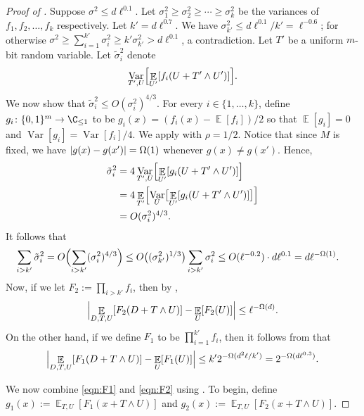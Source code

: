 \documentclass{toc}
\newcommand{\zo}{\{0,1\}}
\def\Blocklength{\ell}
\DeclarePairedDelimiter{\abs}{\lvert}{\rvert}
\DeclareMathOperator*{\E}{\mathbb{E}}                 %
\DeclareMathOperator*{\Var}{Var}                 %
\begin{document}
\begin{proof}[Proof of {}]
    Suppose $\sigma^2 \le d\Blocklength^{0.1}$.
    Let $\sigma_1^2 \ge \sigma_2^2 \ge \cdots \ge \sigma_k^2$ be the variances of $f_1, f_2, \ldots, f_k$ respectively.
    Let $k' = d\Blocklength^{0.7}$.
    We have $\sigma_{k'}^2 \le d\Blocklength^{0.1} / k' = \Blocklength^{-0.6}$; for otherwise $\sigma^2 \ge \sum_{i=1}^{k'} \sigma_i^2 \ge k' \sigma_{k'}^2 > d\Blocklength^{0.1}$, a contradiction.
    Let $T'$ be a 
    uniform $m$-bit random variable.  
%
    Let $\tilde \sigma_i^2$ denote 
    \[
      \Var_{T',U} \Bigl[ \E_{U'} [f_i(U + T' \wedge U')] \Bigr] .
    \]
    We now show that $\tilde \sigma_i^2 \le O(\sigma_i^2)^{4/3}$.
    For every $i \in \{1, \ldots, k\}$, define $g_i\colon \zo^m \to \C_{\le 1}$ to be $g_i(x) = (f_i(x) - \E[f_i])/2$ so that $\E[g_i] = 0$ and $\Var[g_i] = \Var[f_i]/4$.
    We apply  with $\rho = 1/2$.
    Notice that since $M$ is fixed, we have $\abs{g(x) - g(x')} = \Omega(1)$ whenever $g(x) \neq g(x')$.
    Hence,
    \begin{align*}
      \tilde \sigma_i^2
      &= 4 \Var_{T',U} \Bigl[ \E_{U'} [g_i(U + T' \wedge U')] \Bigr] \\
      &= 4 \E_{T'} \Bigl[ \Var_U \bigl[ \E_{U'} [g_i(U + T' \wedge U')] \bigr] \Bigr] \\
      &= O(\sigma_i^2)^{4/3} .
    \end{align*}
    It follows that
    \begin{align*}
      \sum_{i > k'} \tilde \sigma_i^2
      &= O \Bigl( \sum_{i > k'} (\sigma_i^2)^{4/3} \Bigr)
      \le O\bigl( (\sigma_{k'}^2)^{1/3} \bigr) \sum_{i > k'} \sigma_i^2
      \le O(\Blocklength^{-0.2}) \cdot d\Blocklength^{0.1} = d \Blocklength^{-\Omega(1)}.
    \end{align*}
    Now, if we let $F_2 := \prod_{i > k'} f_i$, then by , 
    \begin{align}
      \Bigl| \E_{D,T,U} [ F_2(D+T \wedge U) ] - \E_U[F_2(U)] \Bigr|
      \le \Blocklength^{-\Omega(d)} . \label{eqn:F1}
    \end{align}
    On the other hand, if we define $F_1$ to be $\prod_{i=1}^{k'} f_i$, then it follows from  that
    \begin{align}
      \Bigl| \E_{D,T,U} [ F_1(D + T \wedge U) ] - \E_U[F_1(U)] \Bigr|
      \le k' 2^{-\Omega(d^2 \Blocklength/k')}
      = 2^{-\Omega(d \Blocklength^{0.3})} . \label{eqn:F2}
    \end{align}

    We now combine \eqref{eqn:F1} and \eqref{eqn:F2} using .
    To begin, define $g_1(x) := \E_{T,U}[F_1(x + T \wedge U)]$ and $g_2(x) := \E_{T,U}[F_2(x + T \wedge U)]$.


\end{proof}
\end{document}
